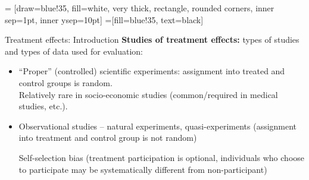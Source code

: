 \documentclass{beamer}
\begin{document}
 = [draw=blue!35, fill=white, very thick,
    rectangle, rounded corners, inner sep=1pt, inner ysep=10pt]
 =[fill=blue!35, text=black]
\begin{frame}{Treatment effects: Introduction}
\textbf{Studies of treatment effects:} types of studies and types of data used for evaluation:\\
\begin{itemize}
    \item ``Proper'' (controlled) scientific experiments: assignment into treated and control groups is random. \\ \medskip Relatively rare in socio-economic studies (common/required in medical studies, etc.). 
    \bigskip
    \item Observational studies -- natural experiments, quasi-experiments (assignment into treatment and control group is not random) \\ \medskip
    
    Self-selection bias (treatment participation is optional, individuals who choose to participate may be systematically different from non-participant)
\end{itemize}
\end{frame}
\end{document}
